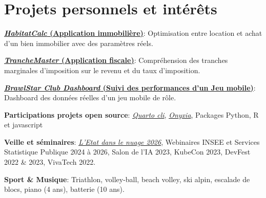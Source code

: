 \documentclass[a4paper,10pt]{article}
\newlength{\spaceItemEnd}\setlength{\spaceItemEnd}{-0.8pt}
\newlength{\spaceSubItem}\setlength{\spaceSubItem}{-4pt}
\newlength{\spaceProjSec}\setlength{\spaceProjSec}{0.5mm}
\newcommand{\resumeItem}[2]{
  \item\small{
    \textbf{#1}{: #2\vspace{\spaceItemEnd}}
  }
}
\newcommand{\resumeSubItem}[2]{
    \small{\resumeItem{#1}{#2}\vspace{\spaceSubItem}}
	
}
\newcommand{\resumeSubHeadingListStart}{\begin{itemize}[leftmargin=*,label=\textbullet]}
\newcommand{\resumeSubHeadingListEnd}{\end{itemize}}
\begin{document}

\section{Projets personnels et intérêts}
\vspace{\spaceProjSec}
\begin{minipage}[t]{0.9865\textwidth}

\resumeSubHeadingListStart
    \resumeSubItem{\href{https://odysseu.github.io/HabitatCalc/}{\textit{HabitatCalc} (Application immobilière)}}{Optimisation entre location et achat d'un bien immobilier avec des paramètres réels.}
    \resumeSubItem{\href{https://odysseu.github.io/TrancheMaster/}{\textit{TrancheMaster} (Application fiscale)}}{Compréhension des tranches marginales d'imposition sur le revenu et du taux d'imposition.}
    \resumeSubItem{\href{https://github.com/odysseu/Brawlstar-Club-Dashboard.github.io}{\textit{BrawlStar Club Dashboard} (Suivi des performances d'un Jeu mobile)}}{Dashboard des données réelles d'un jeu mobile de rôle.}
    \resumeSubItem{Participations projets open source}{\href{https://github.com/quarto-dev/quarto-cli}{\textit{Quarto cli}}, \href{https://github.com/InseeFrLab/onyxia}{\textit{Onyxia}}, Packages Python, R et javascript}
    \resumeSubItem{Veille et séminaires}{\href{https://www.numerique.gouv.fr/agenda/etat-dans-le-nuage-2026/}{\textit{L'Etat dans le nuage 2026}}, Webinaires INSEE et Services Statistique Publique 2024 à 2026, Salon de l'IA 2023, KubeCon 2023, DevFest 2022 \& 2023, VivaTech 2022.}
    \resumeSubItem{Sport \& Musique}{Triathlon, volley-ball, beach volley, ski alpin, escalade de blocs, piano (4 ans), batterie (10 ans).}
\resumeSubHeadingListEnd
\end{minipage}


\end{document}
